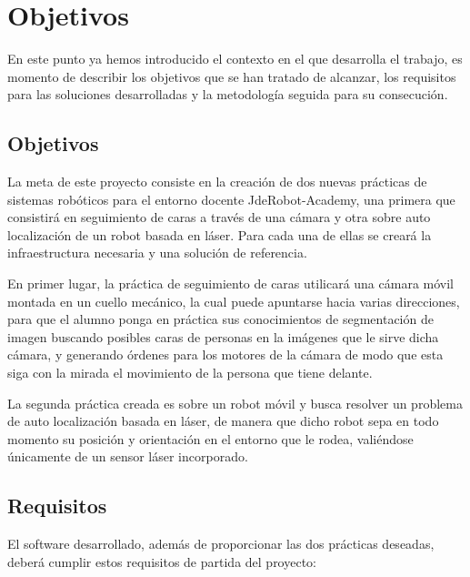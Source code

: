 \chapter{Objetivos}\label{cap.objetivos}
En este punto ya hemos introducido el contexto en el que desarrolla el trabajo, es momento de describir los objetivos que se han tratado de alcanzar, los requisitos para las soluciones desarrolladas y la metodología seguida para su consecución.

\section{Objetivos}
La meta de este proyecto consiste en la creación de dos nuevas prácticas de sistemas robóticos para el entorno docente JdeRobot-Academy, una primera que consistirá en seguimiento de caras a través de una cámara y otra sobre auto localización de un robot basada en láser. Para cada una de ellas se creará la infraestructura necesaria y una solución de referencia.

En primer lugar, la práctica de seguimiento de caras utilicará una cámara móvil montada en un cuello mecánico, la cual puede apuntarse hacia varias direcciones, para que el alumno ponga en práctica sus conocimientos de segmentación de imagen buscando posibles caras de personas en la imágenes que le sirve dicha cámara, y generando órdenes para los motores de la cámara de modo que esta siga con la mirada el movimiento de la persona que tiene delante.

La segunda práctica creada es sobre un robot móvil y busca resolver un problema de auto localización basada en láser, de manera que dicho robot sepa en todo momento su posición y orientación en el entorno que le rodea, valiéndose únicamente de un sensor láser incorporado.

\section{Requisitos} 
El software desarrollado, además de proporcionar las dos prácticas deseadas, deberá cumplir estos requisitos de partida del proyecto:

